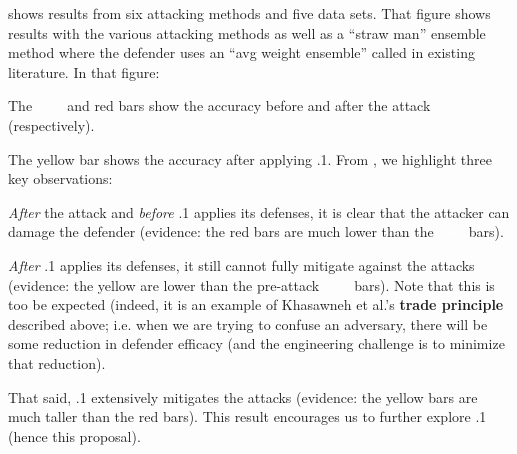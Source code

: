  shows results from six attacking methods and five data sets. That figure shows results with the various attacking methods as well as a ``straw man'' ensemble method where the defender uses an ``avg weight ensemble'' called in existing literature. In that figure:
\bi
\item
The \colorbox{blue1}{\textcolor{white}{blue}} and \colorbox{red1}{red} bars show the accuracy before and after the attack
(respectively).
\item 
The \colorbox{yellow1}{yellow} bar shows the accuracy after applying {\IT}.1.
\ei
From , we highlight three key observations:
\bi
\item {\em After} the attack and {\em before} {\IT}.1 applies
its defenses, it is clear that the attacker can damage the defender  (evidence: the 
\colorbox{red1}{red} bars are much lower than the \colorbox{blue1}{\textcolor{white}{blue}} bars).
\item 
{\em After} {\IT}.1 applies
its defenses, it still cannot fully mitigate against the attacks (evidence: the 
\colorbox{yellow1}{yellow}  are lower than the pre-attack
\colorbox{blue1}{\textcolor{white}{blue}} bars). Note that this is too be expected 
(indeed, it is an example of Khasawneh  et  al.'s {\bf trade principle} described above; i.e. when we are trying to confuse an adversary, there will be some reduction in defender efficacy (and the engineering challenge is to minimize that reduction).
\item
That said, 
{\IT}.1   extensively mitigates the   attacks (evidence: the
\colorbox{yellow1}{yellow} bars are much taller than the \colorbox{red1}{red} bars).
\ei
This result encourages us to  further explore
{\IT}.1 (hence this proposal).




